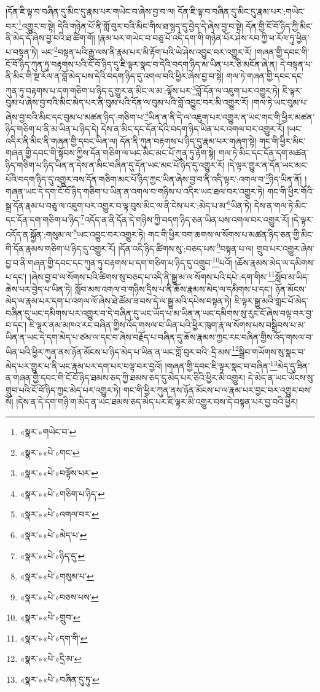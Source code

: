 །དོན་ཇི་ལྟ་བ་བཞིན་དུ་མིང་དུ་རྣམ་པར་གཡེང་བ་ཞེས་བྱ་བ་ལ། དོན་ཇི་ལྟ་བ་བཞིན་དུ་མིང་དུ་རྣམ་པར་:གཡེང་བར་\footnote{«སྣར་»གཡེང་བ་}འགྱུར་བ་སྟེ། དེའི་གཉེན་པོ་ནི་གློ་བུར་བའི་མིང་གིས་ཐ་སྙད་དུ་བྱེད་དེ་ཞེས་བྱ་བ་སྟེ། དོན་གྱི་ངོ་བོ་ཉིད་ཀྱི་མིང་ནི་མེད་དོ་ཞེས་བྱ་བའི་ཐ་ཚིག་གོ། །རྣམ་པར་གཡེང་བ་བཅུ་པོ་འདི་དག་གི་གཉེན་པོར་ཤེས་རབ་ཀྱི་ཕ་རོལ་ཏུ་ཕྱིན་པ་བསྟན་ཏེ། ཡང་\footnote{«སྣར་»«པེ་»གང་}བསྟན་པའི་རྒྱུ་ལས་ནི་རྣམ་པར་མི་རྟོག་པའི་ཡེ་ཤེས་འབྱུང་བར་འགྱུར་རོ། །གཞན་གྱི་དབང་གི་ངོ་བོ་ཉིད་ཀུན་ཏུ་བརྟགས་པའི་ངོ་བོ་ཉིད་དུ་ཇི་ལྟར་སྣང་བ་དེའི་བདག་ཉིད་མ་ཡིན་པར་ཅི་མངོན་ཞེ་ན། དེ་བསྟན་པ་ནི་མིང་གི་སྔ་རོལ་ན་བློ་མེད་པས་དེའི་བདག་ཉིད་དུ་འགལ་བའི་ཕྱིར་ཞེས་བྱ་བ་སྟེ། གལ་ཏེ་གཞན་གྱི་དབང་དང་ཀུན་ཏུ་བརྟགས་པ་དག་གཅིག་པ་ཉིད་དུ་གྱུར་ན་མིང་ལ་མ་:ལྟོས་པར་\footnote{«སྣར་»«པེ་»བལྟོས་པར་}བློ་དོན་ལ་འཇུག་པར་འགྱུར་ཏེ། ཇི་ལྟར་བུམ་པ་ཞེས་བྱ་བའི་མིང་མེད་པར་ནི་བུམ་པའི་དོན་ལ་བུམ་པའི་བློ་འབྱུང་བར་མི་འགྱུར་རོ། །གལ་ཏེ་ཡང་བུམ་པ་ཞེས་བྱ་བའི་མིང་དང་བུམ་པ་མཚན་ཉིད་:གཅིག་པ་\footnote{«སྣར་»«པེ་»གཅིག་པ་ཉིད་}ཡིན་ན་ནི་དེ་ལ་འཇུག་པར་འགྱུར་ན་ཡང་གང་གི་ཕྱིར་མཚན་ཉིད་གཅིག་པ་ནི་མ་ཡིན་པ་ཉིད་དེ། དེས་ན་མིང་དང་དོན་དེའི་བདག་ཉིད་ཡིན་པར་འགལ་བར་འགྱུར་རོ། །ཡང་འདིར་ནི་མིང་ནི་གཞན་གྱི་དབང་ཡིན་ལ། དོན་ནི་ཀུན་བརྟགས་པ་ཉིད་དུ་རྣམ་པར་གཞག་སྟེ། གང་གི་ཕྱིར་མིང་གཞན་གྱི་དབང་གི་སྟོབས་ཀྱིས་དོན་གཅིག་ལ་ཡང་མིང་མང་པོ་ཀུན་ཏུ་རྟོག་སྟེ། གལ་ཏེ་མིང་དང་དོན་དག་མཚན་ཉིད་གཅིག་པ་ཉིད་ཡིན་ན་དེས་ན་མིང་བཞིན་དུ་དོན་ཡང་མང་པོ་ཉིད་དུ་འགྱུར་རོ། །དེ་ལྟར་གྱུར་ན་དོན་ཡང་མང་པོའི་བདག་ཉིད་དུ་འགྱུར་བས་དོན་གཅིག་མང་པོ་ཉིད་ཀྱང་ཡིན་ཞེས་བྱ་བ་ནི་འདི་ལྟར་:འགལ་བ་\footnote{«སྣར་»«པེ་»འགལ་བར་}ཉིད་ཡིན་ནོ། །གཞན་ཡང་དེ་དག་ངོ་བོ་ཉིད་གཅིག་པ་ཡིན་ན་འགལ་བ་གཉིས་པ་འདིར་ཡང་ཐལ་བར་འགྱུར་ཏེ། གང་གི་ཕྱིར་གོའི་སྒྲ་དོན་རྣམ་པ་བཅུ་ལ་འཇུག་པར་འགྱུར་བ་ལྟ་བུས་མིང་ལ་ནི་ངེས་པར་:མེད་པ་མ་\footnote{«སྣར་»«པེ་»མེད་པ་}ཡིན་ཏེ། དེས་ན་གལ་ཏེ་མིང་དང་དོན་དག་གཅིག་པ་ཉིད་\footnote{«སྣར་»«པེ་»ཉིད་དུ་}འདོད་ན་ནི་དོན་དེ་གཉིས་ཀྱི་བདག་ཉིད་ཅན་ཡིན་པས་འགལ་བར་འགྱུར་རོ། །དེ་ལྟར་འདོད་ན་སྐྱོན་:གསུམ་ལ་\footnote{«སྣར་»«པེ་»གསུམ་པ་}ཡང་འབྱུང་བར་འགྱུར་ཏེ། གང་གི་ཕྱིར་བག་ཆགས་ལ་སོགས་པ་མཚན་ཉིད་ཅན་གྱི་མིང་གི་དོན་རྣམས་གཅིག་པ་ཉིད་དུ་འགྱུར་རོ། །དོན་འདི་ཉིད་ཚིགས་སུ་:བཅད་པས་\footnote{«སྣར་»«པེ་»བཅས་པས་}བསྟན་པ་ལ། གྲུབ་པར་འགྱུར་ཞེས་བྱ་བ་ནི་གཞན་གྱི་དབང་དང་ཀུན་ཏུ་བརྟགས་པ་དག་གཅིག་པ་ཉིད་དུ་འགྲུབ་\footnote{«སྣར་»«པེ་»གྲུབ་}པའོ། །ཆོས་རྣམས་མེད་ལ་དམིགས་པ་དང་། །ཞེས་བྱ་བ་ལ་སོགས་པའི་ཚིགས་སུ་བཅད་པ་འདི་ནི་སྒྱུ་མ་ལ་སོགས་པའི་དཔེ་:དག་གིས་\footnote{«སྣར་»«པེ་»དག་གི་}སློབ་མ་ཡིད་ཆེས་པར་བྱེད་པ་ཡིན་ཏེ། སློབ་མས་འགལ་བ་གཉིས་དྲིས་པ་ནི་ཆོས་རྣམས་མེད་ལ་དམིགས་པ་དང་། ཉོན་མོངས་མེད་ལ་རྣམ་པར་དག་པ་འགལ་ལོ་ཞེས་ཐེ་ཚོམ་ཟ་བས་དེ་ལ་སྒྱུ་མའི་དཔེས་བསྟན་ཏེ། ཇི་ལྟར་སྒྱུ་མའི་གླང་པོ་མེད་བཞིན་དུ་ཡང་དམིགས་པར་འགྱུར་བ་དེ་བཞིན་དུ་ཡང་ཡོད་པ་མ་ཡིན་ན་ཡང་དམིགས་སུ་རུང་ངོ་ཞེས་བལྟ་བར་བྱ་བ་དང་། ཇི་ལྟར་ནམ་མཁའ་རང་བཞིན་གྱིས་འོད་གསལ་བ་ཡིན་པའི་ཕྱིར་ཁུག་རྣ་ལ་སོགས་པས་བསྒྲིབས་པ་མ་ཡིན་ན་ཡང་དེ་དག་མེད་པ་ཙམ་ལ་དང་བ་ཞེས་བརྗོད་པ་བཞིན་དུ་ཆོས་རྣམས་ཀྱང་རང་བཞིན་གྱིས་འོད་གསལ་བ་ཡིན་པའི་ཕྱིར་ཀུན་ནས་ཉོན་མོངས་པ་ཉིད་མེད་པ་ཡིན་ན་ཡང་གློ་བུར་བའི་:དྲི་མས་\footnote{«སྣར་»«པེ་»དྲི་མ་}སྒྲིབ་གཡོགས་སུ་སྣང་བ་མེད་པར་གྱུར་པ་ནི་ཡང་རྣམ་པར་དག་པར་བལྟ་བར་བྱའོ། །གཞན་གྱི་དབང་ཇི་ལྟར་སྣང་བ་བཞིན་\footnote{«སྣར་»«པེ་»བཞིན་དུ་ཏུ་}མེད་དུ་ཟིན་ན་གཞན་གྱི་དབང་གི་ངོ་བོ་ཉིད་ཐམས་ཅད་ཀྱི་ཐམས་ཅད་དུ་མེད་པར་ཅིའི་ཕྱིར་མི་འགྱུར། དེ་མེད་ན་ཡང་ཡོངས་སུ་གྲུབ་པའི་ངོ་བོ་ཉིད་ཀྱང་མེད་པར་འགྱུར་ཏེ། གང་གི་ཕྱིར་ཀུན་ནས་ཉོན་མོངས་པ་ལ་རྣམ་པར་བྱང་བར་འགྱུར་བས་སོ། །དེས་ན་དེ་དག་གཉི་ག་མེད་ན་ཡང་ཐམས་ཅད་མེད་པར་ཇི་ལྟར་མི་འགྱུར་བས་དེ་བསྟན་པར་བྱ་བའི་ཕྱིར། 